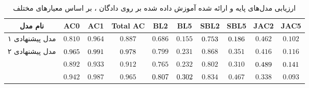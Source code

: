 \begin{table}[!htb]
	\centering
	\caption{
		ارزیابی مدل‌های پایه و ارائه شده آموزش داده شده بر روی دادگان ، بر اساس معیار‌های مختلف}
	\label{table:yelp_result}
	\small\tabcolsep=0.07cm
	\begin{tabular}{||c||c c c|c c|c c|c c||}\hline\hline نام مدل & AC0                        & AC1                        & Total AC                   & BL2                        & BL5                        & SBL2                       & SBL5                       & JAC2                       & JAC5                       \\
		\hline\hline
		مدل پیشنهادی ۱
                                        & $0.810$                    & $0.964$                    & $0.887$                    & $0.686$                    & $0.155$                    & $\cellcolor{gray!25}0.753$ & $\cellcolor{gray!25}0.186$ & $0.462$                    & $0.102$                    \\
		\hline
		مدل پیشنهادی ۲
                                         & $\cellcolor{gray!25}0.965$ & $\cellcolor{gray!25}0.991$ & $\cellcolor{gray!25}0.978$ & $0.799$                    & $0.231$                    & $0.868$                    & $0.351$                    & $0.416$                    & $0.116$                    \\
		\hline
		\towardctg{}                           & $0.892$                    & $0.933$                    & $0.912$                    & $0.765$                    & $0.232$                    & $0.802$                    & $0.310$                    & $\cellcolor{gray!25}0.489$ & $\cellcolor{gray!25}0.141$ \\
		\hline
		\sentigan{}                                          & $0.942$                    & $0.987$                    & $0.965$                    & $\cellcolor{gray!25}0.807$ & $\cellcolor{gray!25}0.302$ & $0.834$                    & $0.467$                    & $0.338$                    & $0.093$                    \\
		\hline
		\hline\end{tabular}\normalsize
\end{table}


